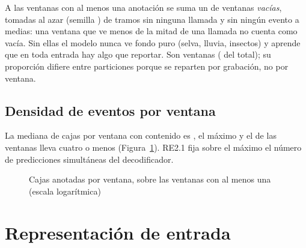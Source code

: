 \documentclass[12pt,a4paper]{article}
\begin{document}
A las ventanas con al menos una anotación se suma un \emptyRatio{} de ventanas \emph{vacías},
tomadas al azar (semilla \seed{}) de tramos sin ninguna llamada y sin ningún evento a medias:
una ventana que ve menos de la mitad de una llamada no cuenta como vacía. Sin ellas el modelo
nunca ve fondo puro (selva, lluvia, insectos) y aprende que en toda entrada hay algo que
reportar. Son \nEmpty{} ventanas
(\pctEmpty{} del total); su proporción difiere entre particiones porque se reparten por
grabación, no por ventana.


\subsection{Densidad de eventos por ventana}

La mediana de cajas por ventana con contenido es \medianPerWindow{}, el máximo \maxPerWindow{}
y el \pctLeqFour{} de las ventanas lleva cuatro o menos (Figura~\ref{fig:densidad}). RE2.1
fija sobre el máximo el número de predicciones simultáneas del decodificador.

\begin{figure}[htbp]
    \centering
    \caption{Cajas anotadas por ventana, sobre las ventanas con al menos una (escala
        logarítmica)}
    \label{fig:densidad}
\end{figure}

\section{Representación de entrada}
\label{sec:representacion}
\end{document}
